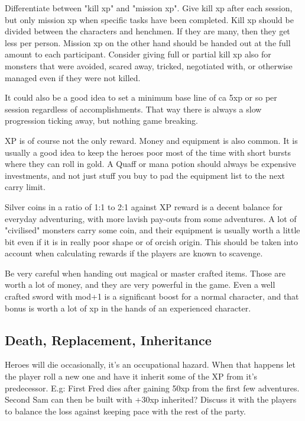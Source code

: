 Differentiate between "kill xp" and "mission xp". Give kill xp after each session, but only mission xp when specific tasks have been completed.
Kill xp should be divided between the characters and henchmen. If they are many, then they get less per person. Mission xp on the other hand should be handed out at the full amount to each participant.
Consider giving full or partial kill xp also for monsters that were avoided, scared away, tricked, negotiated with, or otherwise managed even if they were not killed.

It could also be a good idea to set a minimum base line of ca 5xp or so per session regardless of accomplishments. That way there is always a slow progression ticking away, but nothing game breaking.

XP is of course not the only reward. Money and equipment is also common. It is usually a good idea to keep the heroes poor most of the time with short bursts where they can roll in gold. A Quaff or mana potion should always be expensive investments, and not just stuff you buy to pad the equipment list to the next carry limit.

Silver coins in a ratio of 1:1 to 2:1 against XP reward is a decent balance for everyday adventuring, with more lavish pay-outs from some adventures. A lot of "civilised" monsters carry some coin, and their equipment is usually worth a little bit even if it is in really poor shape or of orcish origin. This should be taken into account when calculating rewards if the players are known to scavenge.

Be very careful when handing out magical or master crafted items. Those are worth a lot of money, and they are very powerful in the game. Even a well crafted sword with mod+1 is a significant boost for a normal character, and that bonus is worth a lot of xp in the hands of an experienced character.


\subsection*{Death, Replacement, Inheritance}
Heroes will die occasionally, it's an occupational hazard. When that happens let the player roll a new one and have it inherit some of the XP from it's predecessor. E.g: First Fred dies after gaining 50xp from the first few adventures. Second Sam can then be built with +30xp inherited? Discuss it with the players to balance the loss against keeping pace with the rest of the party.










